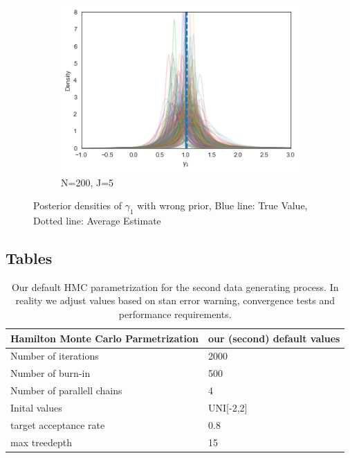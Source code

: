 \begin{figure}[h!]
  \begin{subfigure}[b]{0.3\linewidth}
    \includegraphics[width=\linewidth]{graphics/posterior_plot_gamma1_wrong_smallJ}
    \caption{N=200, J=5}
  \end{subfigure}
  \caption{Posterior densities of $\gamma_1$ with wrong prior, Blue line: True Value, Dotted line: Average Estimate}
  \label{fig:posterior_wrong_gamma1}
\end{figure}

\subsection{Tables}

\begin{table}[H]
\begin{center}
\begin{tabular}{l l}
Hamilton Monte Carlo Parmetrization & our (second) default values\\
\hline
Number of iterations &2000  \\
Number of burn-in & 500 \\
Number of parallell chains & 4  \\
Inital values & UNI[-2,2]  \\
target acceptance rate & 0.8  \\
max treedepth & 15 \\
\end{tabular}
\end{center}
\caption{Our default HMC parametrization for the second data generating process. In reality we adjust values based on stan error warning, convergence tests and performance requirements.}
\label{tab:default_2}
\end{table}


